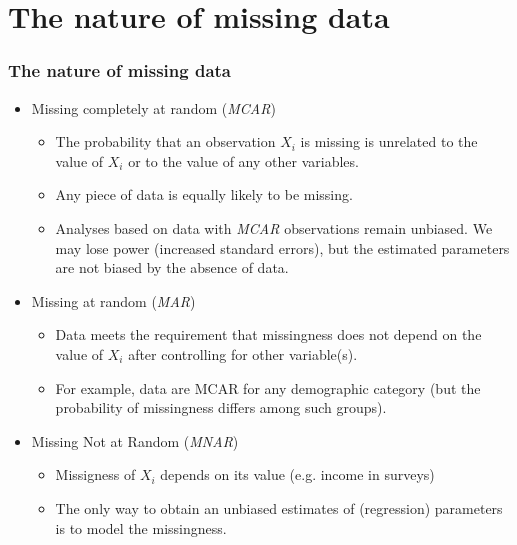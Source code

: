\documentclass{beamer}
\begin{document}
\section{The nature of missing data}
\begin{frame}
\frametitle{The nature of missing data}

\begin{itemize}
  \item[] Missing completely at random (\textit{MCAR})
  \begin{itemize}
  \item The probability that an observation $X_i$ is missing is unrelated to the value of $X_i$ or to the value of any other variables.
  \item Any piece of data is equally likely to be missing.
  \item Analyses based on data with \textit{MCAR} observations remain unbiased. We may lose power (increased standard errors), but the estimated parameters are not biased by the absence of data.
  \end{itemize}
  \vspace{0.2cm}
  \item[] Missing at random (\textit{MAR})
  \begin{itemize}
  \item Data meets the requirement that missingness does not depend on the value of $X_i$ after controlling for other variable(s).
  \item For example, data are MCAR for any demographic category (but the probability of missingness differs among such groups). 
  \end{itemize}
  \vspace{0.2cm}
  \item[] Missing Not at Random (\textit{MNAR})
  \begin{itemize}
  \item Missigness of $X_i$ depends on its value (e.g. income in surveys)
  \item The only way to obtain an unbiased estimates of (regression) parameters is to model the missingness.
  \end{itemize}
\end{itemize}


\end{frame}

\end{document}
